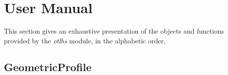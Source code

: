 %

\section{User Manual}

This section gives an exhaustive presentation of the objects and functions provided by the \textit{otlhs} module, in the alphabetic order.

\subsection{GeometricProfile}

